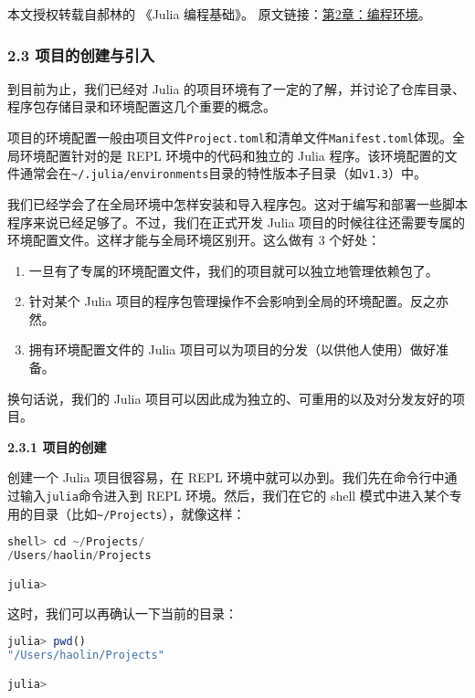 
本文授权转载自郝林的 《Julia 编程基础》。 原文链接：\href{https://github.com/hyper0x/JuliaBasics/blob/master/book/ch02.md}{第2章：编程环境}。


\subsubsection{2.3 项目的创建与引入}

到目前为止，我们已经对 Julia 的项目环境有了一定的了解，并讨论了仓库目录、程序包存储目录和环境配置这几个重要的概念。

项目的环境配置一般由项目文件\verb`Project.toml`和清单文件\verb`Manifest.toml`体现。全局环境配置针对的是 REPL 环境中的代码和独立的 Julia 程序。该环境配置的文件通常会在\verb`~/.julia/environments`目录的特性版本子目录（如\verb`v1.3`）中。

我们已经学会了在全局环境中怎样安装和导入程序包。这对于编写和部署一些脚本程序来说已经足够了。不过，我们在正式开发 Julia 项目的时候往往还需要专属的环境配置文件。这样才能与全局环境区别开。这么做有 3 个好处：

\begin{enumerate}
\item 一旦有了专属的环境配置文件，我们的项目就可以独立地管理依赖包了。
\item 针对某个 Julia 项目的程序包管理操作不会影响到全局的环境配置。反之亦然。
\item 拥有环境配置文件的 Julia 项目可以为项目的分发（以供他人使用）做好准备。
\end{enumerate}

换句话说，我们的 Julia 项目可以因此成为独立的、可重用的以及对分发友好的项目。

\textbf{2.3.1 项目的创建}

创建一个 Julia 项目很容易，在 REPL 环境中就可以办到。我们先在命令行中通过输入\verb`julia`命令进入到 REPL 环境。然后，我们在它的 shell 模式中进入某个专用的目录（比如\verb`~/Projects`），就像这样：

\begin{lstlisting}[language=julia]
shell> cd ~/Projects/
/Users/haolin/Projects

julia> 
\end{lstlisting}

这时，我们可以再确认一下当前的目录：

\begin{lstlisting}[language=julia]
julia> pwd()
"/Users/haolin/Projects"

julia> 
\end{lstlisting}

